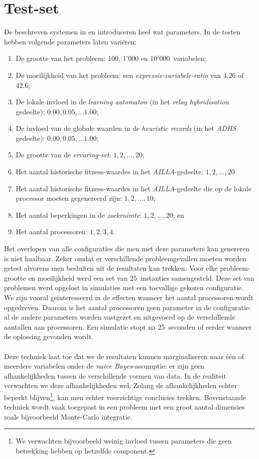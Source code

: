 \section{Test-set}

De beschreven systemen in  en  introduceren heel wat parameters. In de testen hebben volgende parameters laten vari\"eren:
\begin{enumerate}
 \item De grootte van het probleem: 100, 1'000 en $10'000$~variabelen;
 \item De moeilijkheid van het probleem: een \emph{expressie-variabele-ratio} van 4.26 of 42.6;
 \item De lokale invloed in de \emph{learning automaton} (in het \emph{relay hybridisation} gedeelte): $0.00,0.05,\ldots1.00$;
 \item De invloed van de globale waarden in de \emph{heuristic records} (in het \emph{ADHS} gedeelte): $0.00,0.05,\ldots1.00$;
 \item De grootte van de \emph{ervaring-set}: $1,2,\ldots,20$;
 \item Het aantal historische fitness-waardes in het \emph{AILLA}-gedeelte: $1,2,\ldots,20$
 \item Het aantal historische fitness-waardes in het \emph{AILLA}-gedeelte die op de lokale processor moeten gegenereerd zijn: $1,2,\ldots,10$;
 \item Het aantal beperkingen in de \emph{zoekruimte}: $1,2,\ldots,20$; en
 \item Het aantal processoren: $1,2,3,4$.
\end{enumerate}

Het overlopen van alle configuraties die men met deze parameters kan genereren is niet haalbaar. Zeker omdat er verschillende probleemgevallen moeten worden getest alvorens men besluiten uit de resultaten kan trekken. Voor elke probleem-grootte en moeilijkheid werd een set van $25$~instanties samengesteld. Deze set van problemen werd opgelost in simulaties met een toevallige gekozen configuratie. We zijn vooral ge\"interesseerd in de effecten wanneer het aantal processoren wordt opgedreven. Daarom is het aantal processoren geen parameter in de configuratie: al de andere parameters worden vastgezet en uitgevoerd op de verschillende aantallen aan processoren. Een simulatie stopt na $25$~seconden of eerder wanneer de oplossing gevonden wordt.

\paragraph{}
Deze techniek laat toe dat we de resultaten kunnen marginaliseren naar \'e\'en of meerdere variabelen onder de \emph{naive Bayes}-assumptie: er zijn geen afhankelijkheden tussen de verschillende vormen van data. In de realiteit verwachten we deze afhankelijkheden wel. Zolang de afhankelijkheden echter beperkt blijven\footnote{We verwachten bijvoorbeeld weinig invloed tussen parameters die geen betrekking hebben op hetzelfde component.}, kan men echter voorzichtige conclusies trekken. Bovenstaande techniek wordt vaak toegepast in een probleem met een groot aantal dimensies zoals bijvoorbeeld Monte-Carlo integratie.

